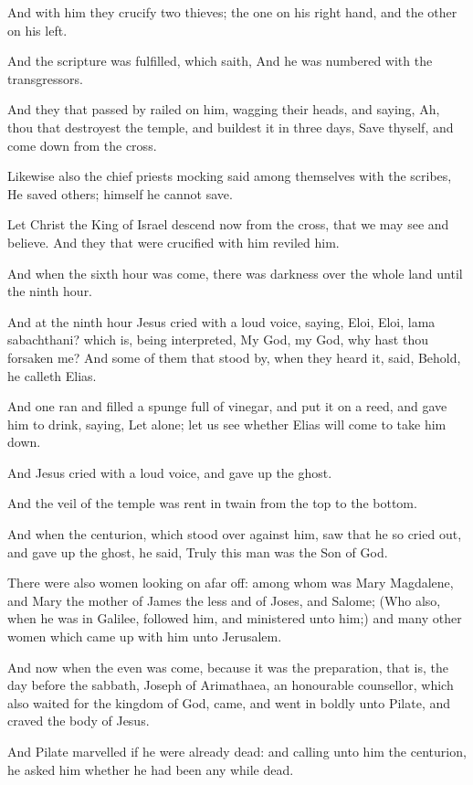\verse And with him they crucify two thieves; the one on his right hand, and the other on his left.

\verse And the scripture was fulfilled, which saith, And he was numbered with the transgressors.

\verse And they that passed by railed on him, wagging their heads, and saying, Ah, thou that destroyest the temple, and buildest it in three days, \verse Save thyself, and come down from the cross.

\verse Likewise also the chief priests mocking said among themselves with the scribes, He saved others; himself he cannot save.

\verse Let Christ the King of Israel descend now from the cross, that we may see and believe. And they that were crucified with him reviled him.

\verse And when the sixth hour was come, there was darkness over the whole land until the ninth hour.

\verse And at the ninth hour Jesus cried with a loud voice, saying, Eloi, Eloi, lama sabachthani? which is, being interpreted, My God, my God, why hast thou forsaken me?  \verse And some of them that stood by, when they heard it, said, Behold, he calleth Elias.

\verse And one ran and filled a spunge full of vinegar, and put it on a reed, and gave him to drink, saying, Let alone; let us see whether Elias will come to take him down.

\verse And Jesus cried with a loud voice, and gave up the ghost.

\verse And the veil of the temple was rent in twain from the top to the bottom.

\verse And when the centurion, which stood over against him, saw that he so cried out, and gave up the ghost, he said, Truly this man was the Son of God.

\verse There were also women looking on afar off: among whom was Mary Magdalene, and Mary the mother of James the less and of Joses, and Salome; \verse (Who also, when he was in Galilee, followed him, and ministered unto him;) and many other women which came up with him unto Jerusalem.

\verse And now when the even was come, because it was the preparation, that is, the day before the sabbath, \verse Joseph of Arimathaea, an honourable counsellor, which also waited for the kingdom of God, came, and went in boldly unto Pilate, and craved the body of Jesus.

\verse And Pilate marvelled if he were already dead: and calling unto him the centurion, he asked him whether he had been any while dead.

